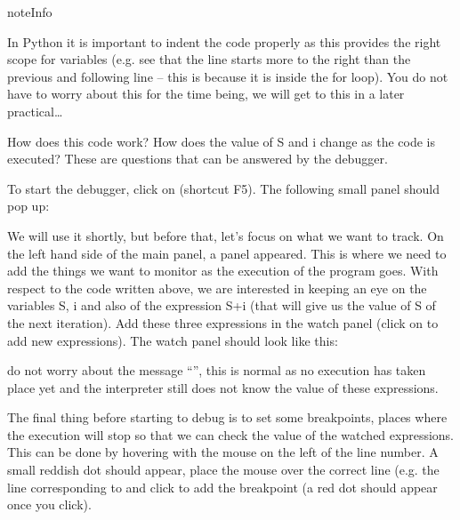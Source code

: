 \documentclass[letterpaper,10pt,english]{sphinxmanual}
\let\sphinxpxdimen\pdfpxdimen\else\newdimen\sphinxpxdimen
\begin{document}
\sphinxAtStartPar
{}

\begin{sphinxadmonition}{note}{Info}\par
\sphinxAtStartPar
In Python it is important to indent the code properly as this provides the right scope for variables (e.g. see that the line  starts more to the right than the previous and following line – this is because it is inside the for loop). You do not have to worry about this for the time being, we will get to this in a later practical…
\end{sphinxadmonition}

\sphinxAtStartPar
How does this code work? How does the value of S and i change as the code is executed? These are questions that can be answered by the debugger.

\sphinxAtStartPar
To start the debugger, click on  (shortcut F5). The following small panel should pop up:

\noindent\sphinxincludegraphics[width=213\sphinxpxdimen,height=53\sphinxpxdimen]{{debug}.png}

\sphinxAtStartPar
We will use it shortly, but before that, let’s focus on what we want to track. On the left hand side of the main panel, a  panel appeared. This is where we need to add the things we want to monitor as the execution of the program goes. With respect to the code written above, we are interested in keeping an eye on the variables S, i and also of the expression S+i (that will give us the value of S of the next iteration). Add these three expressions in the watch panel (click on \sphinxstylestrong{+} to add
new expressions). The watch panel should look like this:

\noindent\sphinxincludegraphics[width=256\sphinxpxdimen,height=100\sphinxpxdimen]{{watch}.png}

\sphinxAtStartPar
do not worry about the message “”, this is normal as no execution has taken place yet and the interpreter still does not know the value of these expressions.

\sphinxAtStartPar
The final thing before starting to debug is to set some breakpoints, places where the execution will stop so that we can check the value of the watched expressions. This can be done by hovering with the mouse on the left of the line number. A small reddish dot should appear, place the mouse over the correct line (e.g. the line corresponding to  and click to add the breakpoint (a red dot should appear once you click).
\end{document}
